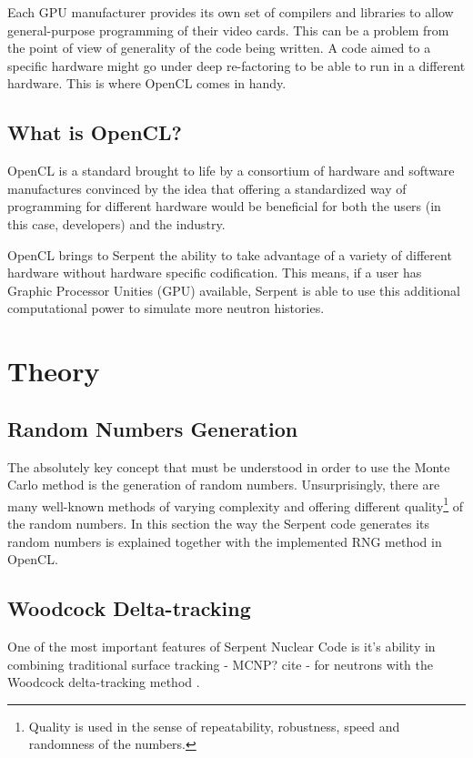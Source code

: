 \documentclass[twoside,a4paper,12pt,english,draft]{anstrans}
\begin{document}
Each GPU manufacturer provides its own set of compilers and libraries to allow general-purpose
programming of their video cards. This can be a problem from the point of view of generality of
the code being written. A code aimed to a specific hardware might go under deep re-factoring to
be able to run in a different hardware. This is where OpenCL comes in handy.

\subsection{What is OpenCL?}

OpenCL\cite{Stone2010} is a standard brought to life by a consortium of hardware and software
manufactures convinced by the idea that offering a standardized way of programming for different
hardware would be beneficial for both the users (in this case, developers) and the industry.

OpenCL brings to Serpent the ability to take advantage of a variety of different hardware
without hardware specific codification. This means, if a user has Graphic Processor Unities (GPU)
available, Serpent is able to use this additional computational power to simulate
more neutron histories.

\section{Theory}

\subsection{Random Numbers Generation}
The absolutely key concept that must be understood in order to use the Monte Carlo method is
the generation of random numbers. Unsurprisingly, there are many well-known methods of varying
complexity and offering different quality\footnote{Quality is used in the sense of
  repeatability, robustness, speed and randomness of the numbers.} of the random numbers.
In this section the way the Serpent code generates its random numbers is explained together
with the implemented RNG method in OpenCL.


\subsection{Woodcock Delta-tracking}

One of the most important features of Serpent Nuclear Code is it's ability in combining
traditional surface tracking - MCNP? cite - for neutrons with the Woodcock delta-tracking method \cite{Woodcock1965}.
\end{document}
